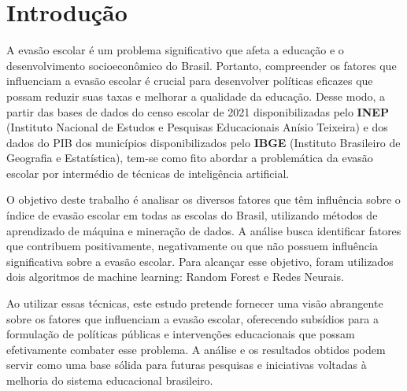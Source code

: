 \newpage
\section{Introdução}

\par A evasão escolar é um problema significativo que afeta a educação e o desenvolvimento socioeconômico do Brasil. Portanto, compreender os fatores que influenciam a evasão escolar é crucial para desenvolver políticas eficazes que possam reduzir suas taxas e melhorar a qualidade da educação. Desse modo, a partir das bases de dados do censo escolar de 2021 disponibilizadas pelo \textbf{INEP} (Instituto Nacional de Estudos e Pesquisas Educacionais Anísio Teixeira) e dos dados do PIB dos municípios disponibilizados pelo \textbf{IBGE} (Instituto Brasileiro de Geografia e Estatística), tem-se como fito abordar a problemática da evasão escolar por intermédio de técnicas de inteligência artificial.

\par O objetivo deste trabalho é analisar os diversos fatores que têm influência sobre o índice de evasão escolar em todas as escolas do Brasil, utilizando métodos de aprendizado de máquina e mineração de dados. A análise busca identificar fatores que contribuem positivamente, negativamente ou que não possuem influência significativa sobre a evasão escolar. Para alcançar esse objetivo, foram utilizados dois algoritmos de machine learning: Random Forest e Redes Neurais.

\par Ao utilizar essas técnicas, este estudo pretende fornecer uma visão abrangente sobre os fatores que influenciam a evasão escolar, oferecendo subsídios para a formulação de políticas públicas e intervenções educacionais que possam efetivamente combater esse problema. A análise e os resultados obtidos podem servir como uma base sólida para futuras pesquisas e iniciativas voltadas à melhoria do sistema educacional brasileiro.
